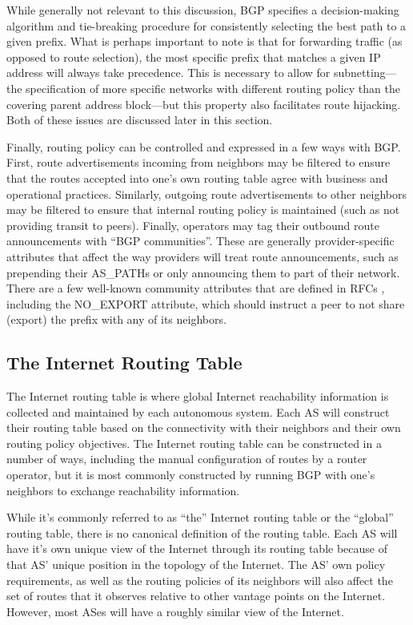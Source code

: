 While generally not relevant to this discussion, BGP specifies a
decision-making algorithm and tie-breaking procedure for consistently selecting
the best path to a given prefix. What is perhaps important to note is that for
forwarding traffic (as opposed to route selection), the most specific prefix
that matches a given IP address will always take precedence. This is necessary
to allow for subnetting---the specification of more specific networks with
different routing policy than the covering parent address block---but this
property also facilitates route hijacking. Both of these issues are discussed
later in this section.

Finally, routing policy can be controlled and expressed in a few ways with BGP.
First, route advertisements incoming from neighbors may be filtered to ensure
that the routes accepted into one's own routing table agree with business and
operational practices. Similarly, outgoing route advertisements to other
neighbors may be filtered to ensure that internal routing policy is maintained
(such as not providing transit to peers). Finally, operators may tag their
outbound route announcements with ``BGP communities''. These are generally
provider-specific attributes that affect the way providers will treat route
announcements, such as prepending their AS\_PATHs or only announcing them to
part of their network. There are a few well-known community attributes that are
defined in RFCs \cite{rfc1997}, including the NO\_EXPORT attribute, which
should instruct a peer to not share (export) the prefix with any of its
neighbors.

\subsection{The Internet Routing Table}

The Internet routing table is where global Internet reachability information is
collected and maintained by each autonomous system. Each AS will construct
their routing table based on the connectivity with their neighbors and their
own routing policy objectives. The Internet routing table can be constructed in
a number of ways, including the manual configuration of routes by a router
operator, but it is most commonly constructed by running BGP with one's
neighbors to exchange reachability information.

While it's commonly referred to as ``the'' Internet routing table or the
``global'' routing table, there is no canonical definition of the routing
table. Each AS will have it's own unique view of the Internet through its
routing table because of that AS' unique position in the topology of the
Internet. The AS' own policy requirements, as well as the routing policies of
its neighbors will also affect the set of routes that it observes relative to
other vantage points on the Internet. However, most ASes will have a roughly
similar view of the Internet.

